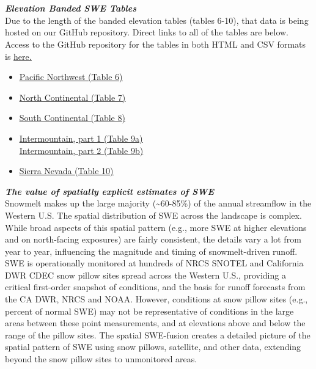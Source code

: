 \documentclass{article}
\begin{document}
\section*{}\label{sec:elev_band_swe}
\fontsize{12}{16}
\noindent\textbf{\textit{Elevation Banded SWE Tables}}\\
\fontsize{10}{14}
\noindent Due to the length of the banded elevation tables (tables 6-10), that data is being hosted on our GitHub repository. Direct links to all of the tables are below. Access to the GitHub repository for the tables in both HTML and CSV formats is \href{https://github.com/CU-Mountain-Hydrology/WestWide}{\underline{here.}}
\begin{itemize}
    \item \href{https://cu-mountain-hydrology.github.io/WestWide_HTML/PNW_20250331_table06.html}{\underline{Pacific Northwest (Table 6)}}
    \item \href{https://cu-mountain-hydrology.github.io/WestWide_HTML/NOCN_20250331_table07.html}{\underline{North Continental (Table 7)}}
    \item \href{https://cu-mountain-hydrology.github.io/WestWide_HTML/SOCN_20250331_table08.html}{\underline{South Continental (Table 8)}}
    \item \href{https://cu-mountain-hydrology.github.io/WestWide_HTML/INMT_20250331_table09a.html}{\underline{Intermountain, part 1 (Table 9a)}}\\
    \href{https://cu-mountain-hydrology.github.io/WestWide_HTML/INMT_20250331_table09b.html}{\underline{Intermountain, part 2 (Table 9b)}}
    \item \href{https://cu-mountain-hydrology.github.io/WestWide_HTML/SNM_20250331_table10.html}{\underline{Sierra Nevada (Table 10)}}\\
\end{itemize}

\fontsize{12}{16}
\noindent\textbf{\textit{The value of spatially explicit estimates of SWE}}\\
\fontsize{10}{14}
\noindent Snowmelt makes up the large majority (\textasciitilde60-85\%) of the annual streamflow in the Western U.S. The spatial distribution of SWE across the landscape is complex. While broad aspects of this spatial pattern (e.g., more SWE at higher elevations and on north-facing exposures) are fairly consistent, the details vary a lot from year to year, influencing the magnitude and timing of snowmelt-driven runoff.\\

\noindent SWE is operationally monitored at hundreds of NRCS SNOTEL and California DWR CDEC snow pillow sites spread across the Western U.S., providing a critical first-order snapshot of conditions, and the basis for runoff forecasts from the CA DWR, NRCS and NOAA. However, conditions at snow pillow sites (e.g., percent of normal SWE) may not be representative of conditions in the large areas between these point measurements, and at elevations above and below the range of the pillow sites. The spatial SWE-fusion creates a detailed picture of the spatial pattern of SWE using snow pillows, satellite, and other data, extending beyond the snow pillow sites to unmonitored areas.\\
\end{document}
